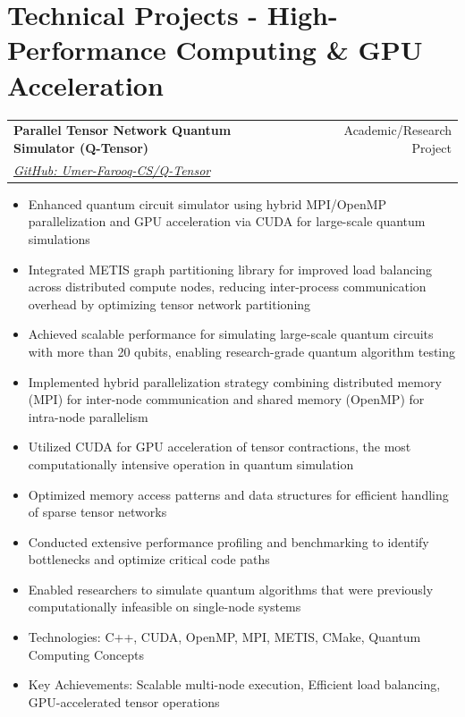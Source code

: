 \documentclass[a4paper,12pt]{article}
\makeatletter
\newenvironment{projectdetailed}[3]
    {
    \begin{tabularx}{\linewidth}{@{}l X r@{}}
    \textbf{#1} & \hfill & #2 \\
    \textit{#3} & & \\[3.75pt]
    \end{tabularx}
    \begin{minipage}[t]{\linewidth}
    \begin{itemize}[nosep,after=\strut, leftmargin=1em, itemsep=2pt,label=--]
    }
    {
    \end{itemize}
    \end{minipage}
    \vspace{6pt}
    }
\makeatother
\begin{document}
\section{Technical Projects - High-Performance Computing \& GPU Acceleration}

\begin{projectdetailed}{Parallel Tensor Network Quantum Simulator (Q-Tensor)}{Academic/Research Project}{\href{https://github.com/Umer-Farooq-CS/Q-Tensor}{GitHub: Umer-Farooq-CS/Q-Tensor}}
\item Enhanced quantum circuit simulator using hybrid MPI/OpenMP parallelization and GPU acceleration via CUDA for large-scale quantum simulations
\item Integrated METIS graph partitioning library for improved load balancing across distributed compute nodes, reducing inter-process communication overhead by optimizing tensor network partitioning
\item Achieved scalable performance for simulating large-scale quantum circuits with more than 20 qubits, enabling research-grade quantum algorithm testing
\item Implemented hybrid parallelization strategy combining distributed memory (MPI) for inter-node communication and shared memory (OpenMP) for intra-node parallelism
\item Utilized CUDA for GPU acceleration of tensor contractions, the most computationally intensive operation in quantum simulation
\item Optimized memory access patterns and data structures for efficient handling of sparse tensor networks
\item Conducted extensive performance profiling and benchmarking to identify bottlenecks and optimize critical code paths
\item Enabled researchers to simulate quantum algorithms that were previously computationally infeasible on single-node systems
\item Technologies: C++, CUDA, OpenMP, MPI, METIS, CMake, Quantum Computing Concepts
\item Key Achievements: Scalable multi-node execution, Efficient load balancing, GPU-accelerated tensor operations
\end{projectdetailed}
\end{document}
